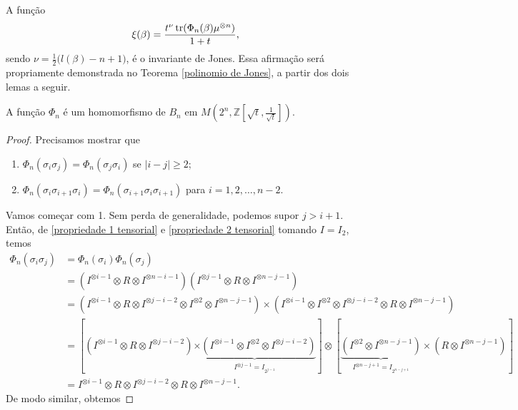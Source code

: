 	\par\vspace{0.3cm} A função
	\begin{equation*}
	    \xi(\beta) = \frac{t^{\nu}\operatorname{tr}(\Phi_n(\beta)\mu^{\otimes n})}{1+t},
	\end{equation*}
	sendo $\nu = \displaystyle{ \frac{1}{2}\big(l(\beta) - n + 1\big) }$, é o invariante de Jones. 
	Essa afirmação será propriamente demonstrada no Teorema \ref{polinomio de Jones}, 
	a partir dos dois lemas a seguir.
	\begin{lemma}
	\label{lema 1 Jones}
		A função $\Phi_n$ é um homomorfismo de $B_n$ em $M(2^n, \mathbb{Z}[\sqrt{t}, \frac{1}{\sqrt{t}}])$.
	\end{lemma}
	\begin{proof}
		Precisamos mostrar que
		\begin{enumerate}
			\item $\Phi_n(\sigma_i\sigma_j) = \Phi_n(\sigma_j\sigma_i)$ se $|i-j|\geq 2$;
			\item $\Phi_n(\sigma_i\sigma_{i+1}\sigma_i) = \Phi_n(\sigma_{i+1}\sigma_i\sigma_{i+1})$ para $i=1,2,\dots, n-2$.
		\end{enumerate}
		Vamos começar com 1. Sem perda de generalidade, podemos supor $j>i+1$. Então, 
		de \eqref{propriedade 1 tensorial} e \eqref{propriedade 2 tensorial} tomando $I = I_2$, temos
		\begin{align*}
    		\Phi_n(\sigma_i\sigma_j) &= \Phi_n(\sigma_i)\Phi_n(\sigma_j) \\
    		&= (I^{\otimes i-1} \otimes R \otimes I^{\otimes n-i-1})
    		( I^{\otimes j-1} \otimes R \otimes I^{\otimes n-j-1} ) \\
    		&= ( I^{\otimes i-1} \otimes R \otimes I^{\otimes j-i-2}\otimes I^{\otimes 2} 
    		\otimes I^{\otimes n-j-1}  ) \times (I^{\otimes i-1} \otimes I^{\otimes 2} 
    		\otimes I^{\otimes j-i-2} \otimes R \otimes I^{\otimes n-j-1} ) \\
    		&= [(I^{\otimes i-1} \otimes R \otimes I^{\otimes j-i-2})
    		\underbrace{\times(I^{\otimes i-1}\otimes I^{\otimes 2} \otimes I^{\otimes j-i-2})}_{I^{\otimes j-1} 
    		= I_{2^{j-1}}}]\otimes [\underbrace{(I^{\otimes 2} \otimes I^{\otimes n-j-1})}_{I^{\otimes n-j+1} 
    		= I_{2^{n-j+1}}  }\times(R \otimes I^{\otimes n-j-1})] \\
    		&= I^{\otimes i-1} \otimes R \otimes I^{\otimes j-i-2} \otimes R \otimes I^{\otimes n-j-1}.
		\end{align*} 
		De modo similar, obtemos

\end{proof}
